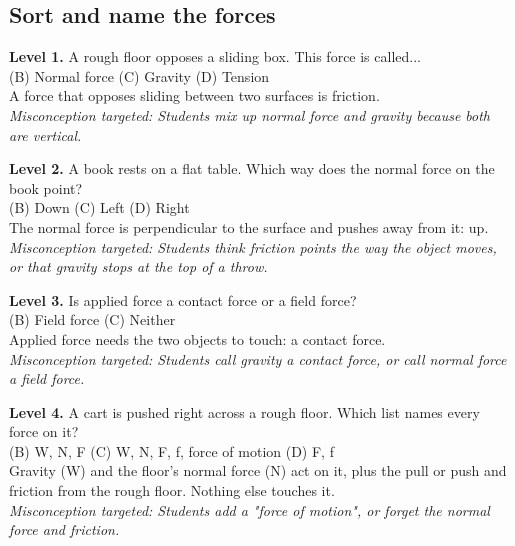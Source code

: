\documentclass[11pt]{article}
\begin{document}
\subsection*{Sort and name the forces}
\noindent\textbf{Level 1.} A rough floor opposes a sliding box. This force is called...\\  \quad (B) Normal force \quad (C) Gravity \quad (D) Tension\\  \quad A force that opposes sliding between two surfaces is friction.\\ \textit{Misconception targeted: Students mix up normal force and gravity because both are vertical.}\par\medskip
\noindent\textbf{Level 2.} A book rests on a flat table. Which way does the normal force on the book point?\\  \quad (B) Down \quad (C) Left \quad (D) Right\\  \quad The normal force is perpendicular to the surface and pushes away from it: up.\\ \textit{Misconception targeted: Students think friction points the way the object moves, or that gravity stops at the top of a throw.}\par\medskip
\noindent\textbf{Level 3.} Is applied force a contact force or a field force?\\  \quad (B) Field force \quad (C) Neither\\  \quad Applied force needs the two objects to touch: a contact force.\\ \textit{Misconception targeted: Students call gravity a contact force, or call normal force a field force.}\par\medskip
\noindent\textbf{Level 4.} A cart is pushed right across a rough floor. Which list names every force on it?\\  \quad (B) W, N, F \quad (C) W, N, F, f, force of motion \quad (D) F, f\\  \quad Gravity (W) and the floor's normal force (N) act on it, plus the pull or push and friction from the rough floor. Nothing else touches it.\\ \textit{Misconception targeted: Students add a "force of motion", or forget the normal force and friction.}\par\medskip
\end{document}
